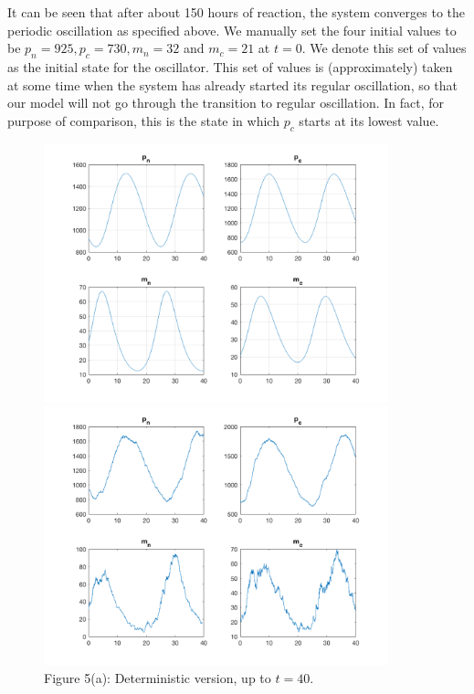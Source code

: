 \documentclass[12pt]{article}
\renewcommand{\(}{\left (}
\renewcommand{\)}{\right )}
\begin{document}
It can be seen that after about 150 hours of reaction, the system converges to the periodic oscillation as specified above. We manually set the four initial values to be $p_n = 925, p_c = 730,m_n = 32$ and $m_c = 21$ at $t=0.$ We denote this set of values as the initial state for the oscillator. This set of values is (approximately) taken at some time when the system has already started its regular oscillation, so that our model will not go through the transition to regular oscillation. In fact, for purpose of comparison, this is the state in which $p_c$ starts at its lowest value.

\begin{figure}[h]
    \centering
	\begin{minipage}{0.45\textwidth}
		\centering
		\includegraphics[width=0.89\textwidth]{single_oscillator_zoom_in.png}
		\caption*{\small Figure 5(a): Deterministic version, up to $t=40.$}
	\end{minipage}
	\begin{minipage}{0.45\textwidth}
		\centering
		\includegraphics[width=0.89\textwidth]{sto_single_oscillator_zoom_in.png}

\end{minipage}
\end{figure}
\end{document}
